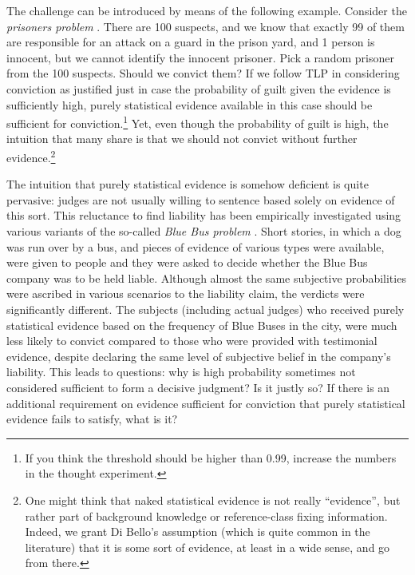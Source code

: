 \documentclass{article}
\begin{document}
The challenge can be introduced by means of the following example.  Consider the \emph{prisoners problem} \citep{Nesson1979Reasonable-doub,redmayne2008exploring}. There are 100 suspects, and we know that exactly 99 of them are  responsible for an attack on a guard in the prison yard, and 1 person is innocent, but we cannot identify the innocent prisoner. Pick a random prisoner from the 100 suspects. Should we convict them? If we follow TLP in considering conviction as justified just in case  the probability of guilt given the evidence is sufficiently high, 
purely statistical evidence available in this case should be sufficient for conviction.\footnote{If you think the threshold should be higher than 0.99, increase the numbers in the thought experiment.}  Yet, even though  the  probability of guilt is high, the intuition that many share is that we should not convict without further evidence.\footnote{One might think that naked statistical evidence is not really ``evidence'', but rather part of background knowledge or reference-class fixing information.  Indeed, we grant Di Bello's assumption (which is quite common in the literature) that it is some sort of evidence, at least in a wide sense, and go from there.} 



   

The intuition that purely statistical evidence is somehow deficient is quite pervasive:  judges are  not usually willing to sentence based solely on evidence of this sort. This reluctance to find liability has been empirically  investigated  using various variants of the so-called \emph{Blue Bus problem} \citep{wells1992naked}. Short stories, in which a  dog was run over by a bus, and pieces of evidence of various types were  available, were given to people and they were asked to decide whether the Blue Bus company was to be held liable. Although almost the same subjective probabilities were ascribed in various scenarios to the liability claim, the verdicts were significantly different. The subjects (including actual judges) who received purely statistical evidence based on the frequency of Blue Buses in the city, were much less likely to convict compared to those who were provided  with testimonial evidence, despite declaring the same level of subjective belief in the company's liability. This leads to questions: why is  high probability  sometimes not considered sufficient to form a decisive judgment? Is it justly so? If there is an additional requirement on evidence sufficient for conviction that purely statistical evidence fails to satisfy,  what is it? 
\end{document}
